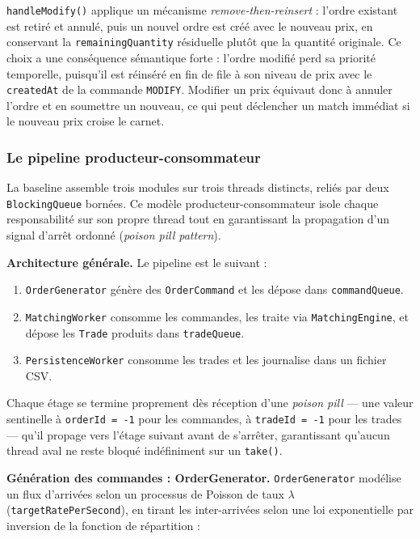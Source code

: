 \texttt{handleModify()} applique un mécanisme \textit{remove-then-reinsert} : l'ordre existant est retiré et annulé, puis un nouvel ordre est créé avec le nouveau prix, en conservant la \texttt{remainingQuantity} résiduelle plutôt que la quantité originale. Ce choix a une conséquence sémantique forte : l'ordre modifié perd sa priorité temporelle, puisqu'il est réinséré en fin de file à son niveau de prix avec le \texttt{createdAt} de la commande \texttt{MODIFY}. Modifier un prix équivaut donc à annuler l'ordre et en soumettre un nouveau, ce qui peut déclencher un match immédiat si le nouveau prix croise le carnet.

\subsubsection{Le pipeline producteur-consommateur}

La baseline assemble trois modules sur trois threads distincts, reliés par deux \texttt{BlockingQueue} bornées. Ce modèle producteur-consommateur isole chaque responsabilité sur son propre thread tout en garantissant la propagation d'un signal d'arrêt ordonné (\textit{poison pill pattern}).

\textbf{Architecture générale.} Le pipeline est le suivant :

\begin{enumerate}
    \item \texttt{OrderGenerator} génère des \texttt{OrderCommand} et les dépose dans \texttt{commandQueue}.
    \item \texttt{MatchingWorker} consomme les commandes, les traite via \texttt{MatchingEngine}, et dépose les \texttt{Trade} produits dans \texttt{tradeQueue}.
    \item \texttt{PersistenceWorker} consomme les trades et les journalise dans un fichier CSV.
\end{enumerate}

Chaque étage se termine proprement dès réception d'une \textit{poison pill} — une valeur sentinelle à \texttt{orderId = -1} pour les commandes, à \texttt{tradeId = -1} pour les trades — qu'il propage vers l'étage suivant avant de s'arrêter, garantissant qu'aucun thread aval ne reste bloqué indéfiniment sur un \texttt{take()}.

\textbf{Génération des commandes : OrderGenerator.} \texttt{OrderGenerator} modélise un flux d'arrivées selon un processus de Poisson de taux $\lambda$ (\texttt{targetRatePerSecond}), en tirant les inter-arrivées selon une loi exponentielle par inversion de la fonction de répartition :

